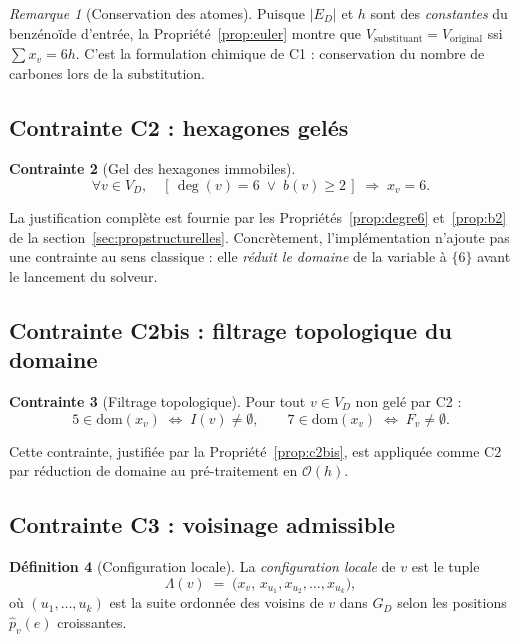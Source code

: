 \documentclass[12pt,a4paper]{article}
\theoremstyle{definition}
\newtheorem{definition}{D\'efinition}[section]
\newtheorem{contrainte}[definition]{Contrainte}
\theoremstyle{remark}
\newtheorem{remarque}[definition]{Remarque}
\newcommand{\GD}{G_{\!D}}
\newcommand{\VD}{V_{\!D}}
\newcommand{\ED}{E_{\!D}}
\newcommand{\xv}{x_v}
\newcommand{\degv}{\deg(v)}
\newcommand{\posIn}[2]{\hat{p}_{#1}(#2)}
\newcommand{\dom}{\mathrm{dom}}
\newcommand{\bigO}{\mathcal{O}}
\begin{document}
\begin{remarque}[Conservation des atomes]
Puisque $|\ED|$ et $h$ sont des \emph{constantes} du benz\'eno\"ide
d'entr\'ee, la Propri\'et\'e~\ref{prop:euler} montre que
$V_{\text{substituant}} = V_{\text{original}}$ ssi
$\sum \xv = 6h$. C'est la formulation chimique de C1 : conservation
du nombre de carbones lors de la substitution.
\end{remarque}

\subsection{Contrainte C2 : hexagones gel\'es}

\begin{contrainte}[Gel des hexagones immobiles]
\label{c:gele}
\[
  \forall v \in \VD,\quad
  [\, \degv = 6 \;\lor\; b(v) \geq 2 \,]
  \;\Longrightarrow\; \xv = 6.
\]
\end{contrainte}

La justification compl\`ete est fournie par les
Propri\'et\'es~\ref{prop:degre6} et~\ref{prop:b2} de la
section~\ref{sec:propstructurelles}. Concr\`etement, l'impl\'ementation
n'ajoute pas une contrainte au sens classique : elle \emph{r\'eduit le
domaine} de la variable \`a $\{6\}$ avant le lancement du solveur.

\subsection{Contrainte C2bis : filtrage topologique du domaine}

\begin{contrainte}[Filtrage topologique]
\label{c:c2bis}
Pour tout $v \in \VD$ non gel\'e par C2 :
\[
  5 \in \dom(\xv) \;\Longleftrightarrow\; I(v) \neq \emptyset,
  \qquad
  7 \in \dom(\xv) \;\Longleftrightarrow\; F_v \neq \emptyset.
\]
\end{contrainte}

Cette contrainte, justifi\'ee par la Propri\'et\'e~\ref{prop:c2bis},
est appliqu\'ee comme C2 par r\'eduction de domaine au pr\'e-traitement
en $\bigO(h)$.

\subsection{Contrainte C3 : voisinage admissible}

\begin{definition}[Configuration locale]
La \emph{configuration locale} de $v$ est le tuple
\[
  \Lambda(v) \;=\; \bigl(\xv,\, x_{u_1}, x_{u_2}, \ldots, x_{u_k}\bigr),
\]
o\`u $(u_1, \ldots, u_k)$ est la suite ordonn\'ee des voisins de $v$
dans $\GD$ selon les positions $\posIn{v}{e}$ croissantes.
\end{definition}
\end{document}
